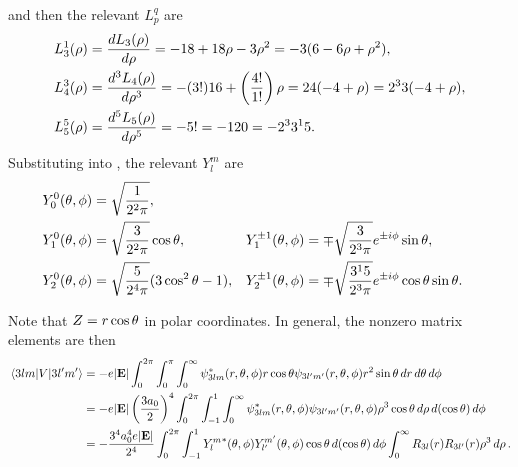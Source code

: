 \begin{solution}
\begin{align*}
	\end{align*}
	and then the relevant $L_p^q$ are
	\begin{align*}
		L_3^1(\rho) &= \dv{L_3(\rho)}{\rho} 
		= -18 + 18 \rho - 3 \rho^2
		= -3 (6 - 6 \rho + \rho^2), \\
		L_4^3(\rho) &= \dv[3]{L_4(\rho)}{\rho}
		= -(3!) 16 + \left( \frac{4!}{1!} \right) \rho
		= 24 (-4 + \rho)
		= 2^3 3 (-4 + \rho), \\
		L_5^5(\rho) &= \dv[5]{L_5(\rho)}{\rho}
		= -5!
		= -120
		= -2^3 3^1 5.
	\end{align*}
	Substituting into , the relevant $Y_l^m$ are
	\begin{align*}
		Y_0^0(\theta, \phi) &= \sqrt{\frac{1}{2^2 \pi}}, \\
		Y_1^0(\theta, \phi) &= \sqrt{\frac{3}{2^2 \pi}} \cos\theta, &
		Y_1^{\pm 1}(\theta, \phi) &= \mp \sqrt{\frac{3}{2^3 \pi}} e^{\pm i \phi} \sin\theta, \\
		Y_2^0(\theta, \phi) &= \sqrt{\frac{5}{2^4 \pi}} (3 \cos^2\theta - 1), &
		Y_2^{\pm1}(\theta, \phi) &= \mp \sqrt{\frac{3^1 5}{2^3 \pi}} e^{\pm i \phi} \cos\theta \sin\theta.
	\end{align*}
	
	Note that $Z = r \cos\theta$ in polar coordinates.  In general, the nonzero matrix elements are then
	\begin{align*}
		\mel{3 l m}{V}{3 l' m'} &= -e |\mathbf{E}| \int_0^{2\pi} \int_0^\pi \int_0^\infty \psi_{3 l m}^*(r, \theta, \phi) r \cos\theta \psi_{3 l' m'}(r, \theta, \phi) r^2 \sin\theta \dd{r} \dd{\theta} \dd{\phi} \\
		&= -e |\mathbf{E}| \left( \frac{3 a_0}{2} \right)^4 \int_0^{2\pi} \int_{-1}^1 \int_0^\infty \psi_{3 l m}^*(r, \theta, \phi) \psi_{3 l' m'}(r, \theta, \phi) \rho^3 \cos\theta \dd{\rho} \dd{(\cos\theta)} \dd{\phi} \\
		&= -\frac{3^4 a_0^4 e |\mathbf{E}|}{2^4} \int_0^{2\pi} \int_{-1}^1 {Y_l^m}^*(\theta, \phi) Y_{l'}^{m'}(\theta, \phi) \cos\theta \dd{(\cos\theta)} \dd{\phi} \int_0^\infty R_{3 l}(r) R_{3 l'}(r) \rho^3 \dd{\rho}.
	\end{align*}
	

\end{solution}
